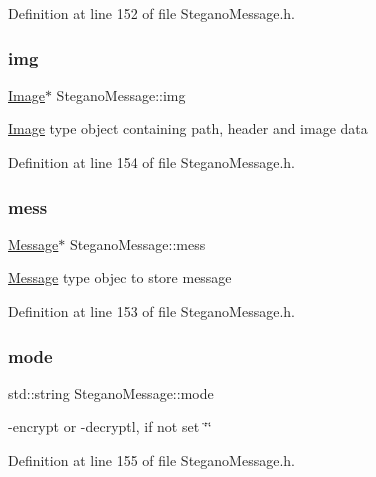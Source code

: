 Definition at line 152 of file Stegano\+Message.\+h.

\mbox{\label{classSteganoMessage_acd7dba217d5df515d93ddf814734ecf4}} 
\subsubsection{\texorpdfstring{img}{img}}
{\footnotesize\ttfamily \mbox{\hyperlink{classImage}{Image}}$\ast$ Stegano\+Message\+::img\hspace{0.3cm}{\ttfamily [private]}}

\mbox{\hyperlink{classImage}{Image}} type object containing path, header and image data 

Definition at line 154 of file Stegano\+Message.\+h.

\mbox{\label{classSteganoMessage_a64f70bbacb0662cebe764316658da35d}} 
\subsubsection{\texorpdfstring{mess}{mess}}
{\footnotesize\ttfamily \mbox{\hyperlink{classMessage}{Message}}$\ast$ Stegano\+Message\+::mess\hspace{0.3cm}{\ttfamily [private]}}

\mbox{\hyperlink{classMessage}{Message}} type objec to store message 

Definition at line 153 of file Stegano\+Message.\+h.

\mbox{\label{classSteganoMessage_a8772194b7823da730648f8d4c06334a8}} 
\subsubsection{\texorpdfstring{mode}{mode}}
{\footnotesize\ttfamily std\+::string Stegano\+Message\+::mode\hspace{0.3cm}{\ttfamily [private]}}

-\/encrypt or -\/decryptl, if not set \char`\"{}\char`\"{} 

Definition at line 155 of file Stegano\+Message.\+h.

